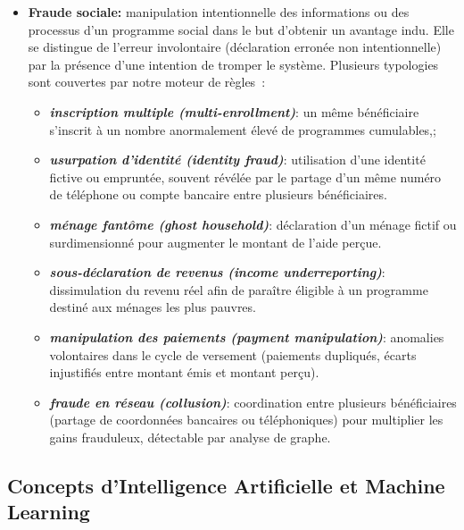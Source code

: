 \documentclass[a4paper, oneside, 12pt]{book}
\begin{document}
\begin{itemize}[label=\textbullet]
    \item \textbf{Fraude sociale:} manipulation intentionnelle des informations ou des processus
    d'un programme social dans le but d'obtenir un avantage indu. Elle se distingue de l'erreur
    involontaire (déclaration erronée non intentionnelle) par la présence d'une intention de
    tromper le système. Plusieurs typologies sont couvertes par notre moteur de règles~:
    \begin{itemize}[label=\textendash]
        \item \textbf{\textit{inscription multiple (multi-enrollment)}}: un même bénéficiaire s'inscrit
        à un nombre anormalement élevé de programmes cumulables,;
        \item \textbf{\textit{usurpation d'identité (identity fraud)}}: utilisation d'une identité
        fictive ou empruntée, souvent révélée par le partage d'un même numéro de téléphone ou
        compte bancaire entre plusieurs bénéficiaires.
        \item \textbf{\textit{ménage fantôme (ghost household)}}: déclaration d'un ménage fictif ou
        surdimensionné pour augmenter le montant de l'aide perçue.
        \item \textbf{\textit{sous-déclaration de revenus (income underreporting)}}: dissimulation du
        revenu réel afin de paraître éligible à un programme destiné aux ménages les plus
        pauvres.
        \item \textbf{\textit{manipulation des paiements (payment manipulation)}}: anomalies
        volontaires dans le cycle de versement (paiements dupliqués, écarts injustifiés entre
        montant émis et montant perçu).
        \item \textbf{\textit{fraude en réseau (collusion)}}: coordination entre plusieurs bénéficiaires
        (partage de coordonnées bancaires ou téléphoniques) pour multiplier les gains
        frauduleux, détectable par analyse de graphe.
    \end{itemize}
    
\end{itemize}


\subsection{Concepts d'Intelligence Artificielle et Machine Learning}
\end{document}
